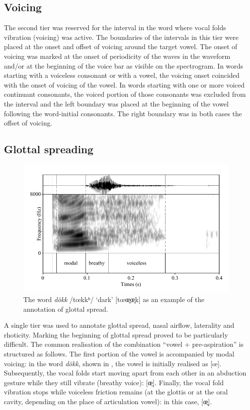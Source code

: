 \documentclass[11pt,a4paper,openany]{memoir}\usepackage[]{graphicx}\usepackage[]{color}
\begin{document}
\subsection{Voicing}

The second tier was reserved for the interval in the word where vocal folds vibration (voicing) was active.
The boundaries of the intervals in this tier were placed at the onset and offset of voicing around the target vowel.
The onset of voicing was marked at the onset of periodicity of the waves in the waveform and/or at the beginning of the voice bar as visible on the spectrogram.
In words starting with a voiceless consonant or with a vowel, the voicing onset coincided with the onset of voicing of the vowel.
In words starting with one or more voiced continuant consonants, the voiced portion of those consonants was excluded from the interval and the left boundary was placed at the beginning of the vowel following the word-initial consonants.
The right boundary was in both cases the offset of voicing.

\subsection{Glottal spreading}

\begin{figure}
\centering
\includegraphics[width=\textwidth]{dokk}
\caption{The word \textit{dökk} /tœkkʰ/ `dark' [tœœ̤̤œ̥k] as an example of the annotation of glottal spread.}
\label{f:glottal}
\end{figure}


A single tier was used to annotate glottal spread, nasal airflow, laterality and rhoticity.
Marking the beginning of glottal spread proved to be particularly difficult.
The common realisation of the combination ``vowel + pre-aspiration'' is structured as follows.
The first portion of the vowel is accompanied by modal voicing: in the word \textit{dökk}, shown in , the vowel is initially realised as [œ].
Subsequently, the vocal folds start moving apart from each other in an abduction gesture while they still vibrate (breathy voice): [œ̤].
Finally, the vocal fold vibration stops while voiceless friction remains (at the glottis or at the oral cavity, depending on the place of articulation vowel): in this case, [œ̥].
\end{document}
